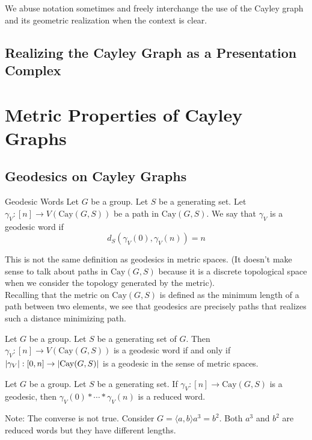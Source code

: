 \documentclass[a4paper]{article}
\begin{document}
We abuse notation sometimes and freely interchange the use of the Cayley graph and its geometric realization when the context is clear. 

\subsection{Realizing the Cayley Graph as a Presentation Complex}

\pagebreak
\section{Metric Properties of Cayley Graphs}
\subsection{Geodesics on Cayley Graphs}
\begin{defn}{Geodesic Words}{} Let $G$ be a group. Let $S$ be a generating set. Let $\gamma_V:[n]\to V(\text{Cay}(G,S))$ be a path in $\text{Cay}(G,S)$. We say that $\gamma_V$ is a geodesic word if $$d_S(\gamma_V(0),\gamma_V(n))=n$$
\end{defn}

This is not the same definition as geodesics in metric spaces. (It doesn't make sense to talk about paths in $\text{Cay}(G,S)$ because it is a discrete topological space when we consider the topology generated by the metric). \\

Recalling that the metric on $\text{Cay}(G,S)$ is defined as the minimum length of a path between two elements, we see that geodesics are precisely paths that realizes such a distance minimizing path. 

\begin{prp}{}{} Let $G$ be a group. Let $S$ be a generating set of $G$. Then $\gamma_V:[n]\to V(\text{Cay}(G,S))$ is a geodesic word if and only if $\abs{\gamma_V}:[0,n]\to\abs{\text{Cay}(G,S)}$ is a geodesic in the sense of metric spaces. 
\end{prp}

\begin{lmm}{}{} Let $G$ be a group. Let $S$ be a generating set. If $\gamma_V:[n]\to\text{Cay}(G,S)$ is a geodesic, then $\gamma_V(0)\ast\cdots\ast\gamma_V(n)$ is a reduced word. 
\end{lmm}

Note: The converse is not true. Consider $G=\langle a,b\rangle a^3=b^2$. Both $a^3$ and $b^2$ are reduced words but they have different lengths. \\
\end{document}
